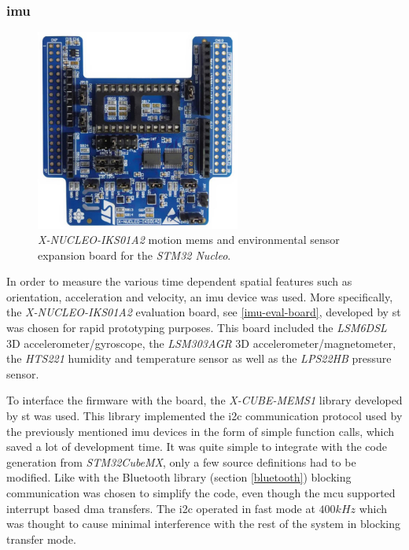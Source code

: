 \subsubsection{\gls{imu}}
\begin{figure}[H]
\centering
\includegraphics[width=0.6\textwidth]{Figures/x-nucleo-iks01a2.jpg}
\caption{\emph{X-NUCLEO-IKS01A2} motion \gls{mems} and environmental sensor expansion board for the \emph{STM32 Nucleo}.}
\label{imu-eval-board}
\end{figure}

In order to measure the various time dependent spatial features such as orientation, acceleration and velocity, an \gls{imu} device was used. More specifically, the \emph{X-NUCLEO-IKS01A2}\cite{x-nucleo-iks01a2} evaluation board, see \autoref{imu-eval-board}, developed by \gls{st} was chosen for rapid prototyping purposes. This board included the \emph{LSM6DSL} 3D accelerometer/gyroscope, the \emph{LSM303AGR} 3D accelerometer/magnetometer, the \emph{HTS221} humidity and temperature sensor as well as the \emph{LPS22HB} pressure sensor.

To interface the firmware with the board, the \emph{X-CUBE-MEMS1}\cite{x-cube-mems1} library developed by \gls{st} was used. This library implemented the \gls{i2c} communication protocol used by the previously mentioned \gls{imu} devices in the form of simple function calls, which saved a lot of development time. It was quite simple to integrate with the code generation from \emph{STM32CubeMX}, only a few source definitions had to be modified. Like with the Bluetooth library (section \ref{bluetooth}) blocking communication was chosen to simplify the code, even though the \gls{mcu} supported interrupt based \gls{dma} transfers. The \gls{i2c} operated in fast mode at $400kHz$ which was thought to cause minimal interference with the rest of the system in blocking transfer mode.

